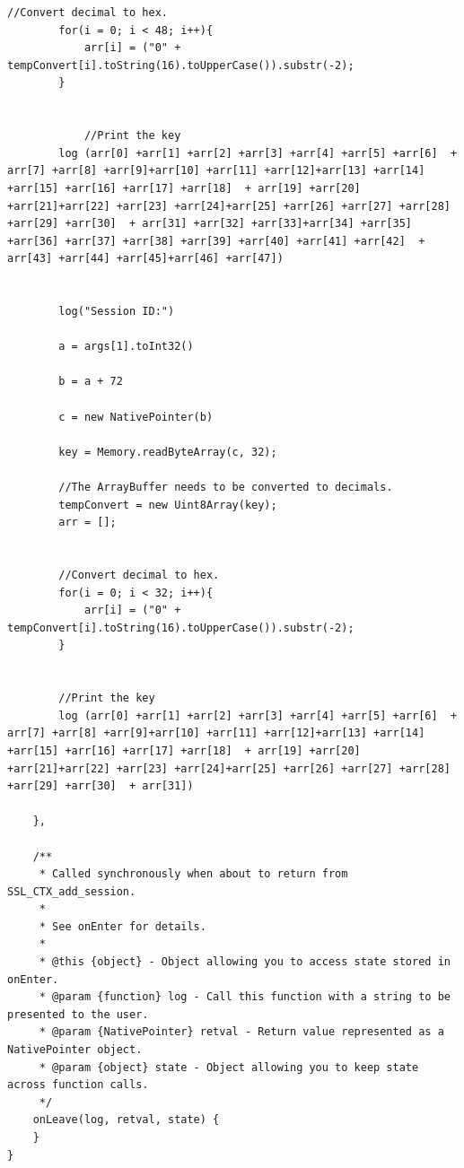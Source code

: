 \documentclass[12pt, a4paper]{report}
\begin{document}
\begin{appendices}
\begin{lstlisting}[frame=single, breaklines=true]
		//Convert decimal to hex. 
		for(i = 0; i < 48; i++){
			arr[i] = ("0" + tempConvert[i].toString(16).toUpperCase()).substr(-2);
		}


			//Print the key
		log (arr[0] +arr[1] +arr[2] +arr[3] +arr[4] +arr[5] +arr[6]  + arr[7] +arr[8] +arr[9]+arr[10] +arr[11] +arr[12]+arr[13] +arr[14] +arr[15] +arr[16] +arr[17] +arr[18]  + arr[19] +arr[20] +arr[21]+arr[22] +arr[23] +arr[24]+arr[25] +arr[26] +arr[27] +arr[28] +arr[29] +arr[30]  + arr[31] +arr[32] +arr[33]+arr[34] +arr[35] +arr[36] +arr[37] +arr[38] +arr[39] +arr[40] +arr[41] +arr[42]  + arr[43] +arr[44] +arr[45]+arr[46] +arr[47])


		log("Session ID:")

		a = args[1].toInt32()

		b = a + 72

		c = new NativePointer(b)

		key = Memory.readByteArray(c, 32);

		//The ArrayBuffer needs to be converted to decimals. 
		tempConvert = new Uint8Array(key);
		arr = [];


		//Convert decimal to hex. 
		for(i = 0; i < 32; i++){
			arr[i] = ("0" + tempConvert[i].toString(16).toUpperCase()).substr(-2);
		}


		//Print the key
		log (arr[0] +arr[1] +arr[2] +arr[3] +arr[4] +arr[5] +arr[6]  + arr[7] +arr[8] +arr[9]+arr[10] +arr[11] +arr[12]+arr[13] +arr[14] +arr[15] +arr[16] +arr[17] +arr[18]  + arr[19] +arr[20] +arr[21]+arr[22] +arr[23] +arr[24]+arr[25] +arr[26] +arr[27] +arr[28] +arr[29] +arr[30]  + arr[31])

    },

    /**
     * Called synchronously when about to return from SSL_CTX_add_session.
     *
     * See onEnter for details.
     *
     * @this {object} - Object allowing you to access state stored in onEnter.
     * @param {function} log - Call this function with a string to be presented to the user.
     * @param {NativePointer} retval - Return value represented as a NativePointer object.
     * @param {object} state - Object allowing you to keep state across function calls.
     */
    onLeave(log, retval, state) {
    }
}
\end{lstlisting}






 

\end{appendices}
\end{document}
